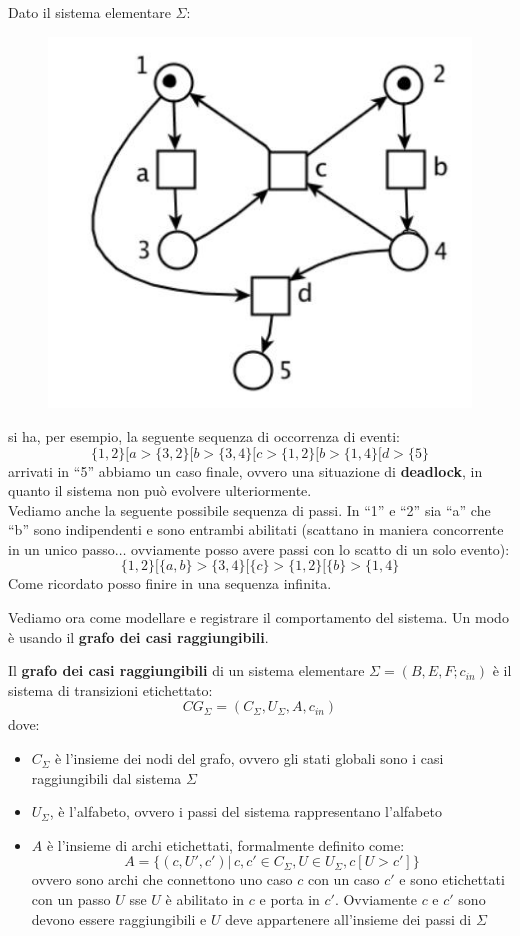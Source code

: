 \documentclass[a4paper,12pt, oneside]{book}
\begin{document}
\begin{esempio}
  Dato il sistema elementare $\Sigma$:
  \begin{figure}[H]
    \centering
    \includegraphics[scale = 0.4]{img/seq.jpg}
  \end{figure}
  si ha, per esempio, la seguente sequenza di occorrenza di eventi:
  \[\{1, 2\}[a > \{3, 2\}[b > \{3, 4\}[c > \{1, 2\}[b > \{1, 4\}[d > \{5\}\]
  arrivati in ``5'' abbiamo un caso finale, ovvero una situazione di
  \textbf{deadlock}, in quanto il sistema non può evolvere ulteriormente.\\
  Vediamo anche la seguente possibile sequenza di passi. In ``1'' e ``2'' sia
  ``a'' che ``b'' sono indipendenti e sono entrambi abilitati (scattano in
  maniera concorrente in un unico passo$\ldots$ ovviamente posso avere passi con lo
  scatto di un solo evento):
  \[\{1, 2\}[\{a, b\} > \{3, 4\}[\{c\} > \{1, 2\}[\{b\} > \{1, 4\}\]
  Come ricordato posso finire in una sequenza infinita.
\end{esempio}
Vediamo ora come modellare e registrare il comportamento del sistema. Un modo è
usando il \textbf{grafo dei casi raggiungibili}.
\begin{definizione}
  Il \textbf{grafo dei casi raggiungibili} di un sistema elementare
  $\Sigma=(B,E,F;c_{in})$ è il sistema di transizioni etichettato:
  \[CG_\Sigma=(C_\Sigma, U_\Sigma, A, c_{in})\]
  dove:
  \begin{itemize}
    \item $C_\Sigma$ è l'insieme dei nodi del grafo, ovvero gli stati globali
    sono i casi raggiungibili dal sistema $\Sigma$    
    \item $U_\Sigma$, è l'alfabeto, ovvero i passi del sistema rappresentano
    l'alfabeto 
    \item $A$ è l'insieme di archi etichettati, formalmente definito come:
    \[A=\{(c,U',c')|\,c,c'\in C_\Sigma, U\in U_\Sigma, c[U>c']\}\]
    ovvero sono archi che connettono uno caso $c$ con un caso $c'$ e sono
    etichettati con un passo $U$ sse $U$ è abilitato in $c$ e porta in
    $c'$. Ovviamente $c$ e $c'$ sono devono essere raggiungibili e $U$ deve
    appartenere all'insieme dei passi di $\Sigma$
  \end{itemize} 
\end{definizione}
\end{document}
